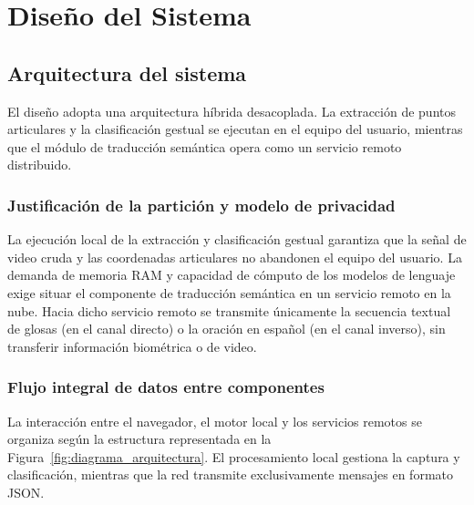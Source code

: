 \chapter{Diseño del Sistema}
\label{cap:diseno_sistema}

\section{Arquitectura del sistema}

El diseño adopta una arquitectura híbrida desacoplada. La extracción de puntos articulares y la clasificación gestual se ejecutan en el equipo del usuario, mientras que el módulo de traducción semántica opera como un servicio remoto distribuido.

\subsection{Justificación de la partición y modelo de privacidad}
La ejecución local de la extracción y clasificación gestual garantiza que la señal de video cruda y las coordenadas articulares no abandonen el equipo del usuario. La demanda de memoria RAM y capacidad de cómputo de los modelos de lenguaje exige situar el componente de traducción semántica en un servicio remoto en la nube. Hacia dicho servicio remoto se transmite únicamente la secuencia textual de glosas (en el canal directo) o la oración en español (en el canal inverso), sin transferir información biométrica o de video.

\subsection{Flujo integral de datos entre componentes}
La interacción entre el navegador, el motor local y los servicios remotos se organiza según la estructura representada en la Figura~\ref{fig:diagrama_arquitectura}. El procesamiento local gestiona la captura y clasificación, mientras que la red transmite exclusivamente mensajes en formato JSON.

